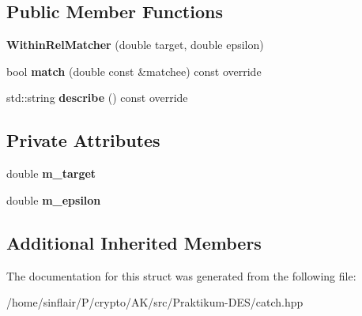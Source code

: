 \subsection*{Public Member Functions}
\begin{DoxyCompactItemize}
\item 
\mbox{\label{structCatch_1_1Matchers_1_1Floating_1_1WithinRelMatcher_aadfe37f6ed9bb025c93e51e11d8bee43}} 
{\bfseries Within\+Rel\+Matcher} (double target, double epsilon)
\item 
\mbox{\label{structCatch_1_1Matchers_1_1Floating_1_1WithinRelMatcher_ac4fc68ff316028137a6d940e10d78e12}} 
bool {\bfseries match} (double const \&matchee) const override
\item 
\mbox{\label{structCatch_1_1Matchers_1_1Floating_1_1WithinRelMatcher_aeabbf5394d7dafebe874fef8a959fe8a}} 
std\+::string {\bfseries describe} () const override
\end{DoxyCompactItemize}
\subsection*{Private Attributes}
\begin{DoxyCompactItemize}
\item 
\mbox{\label{structCatch_1_1Matchers_1_1Floating_1_1WithinRelMatcher_a183b3f551a7b016c741df61d0cde2a79}} 
double {\bfseries m\+\_\+target}
\item 
\mbox{\label{structCatch_1_1Matchers_1_1Floating_1_1WithinRelMatcher_a8bc98bd240502f817308e1c17a153ced}} 
double {\bfseries m\+\_\+epsilon}
\end{DoxyCompactItemize}
\subsection*{Additional Inherited Members}


The documentation for this struct was generated from the following file\+:\begin{DoxyCompactItemize}
\item 
/home/sinflair/\+P/crypto/\+A\+K/src/\+Praktikum-\/\+D\+E\+S/catch.\+hpp\end{DoxyCompactItemize}
